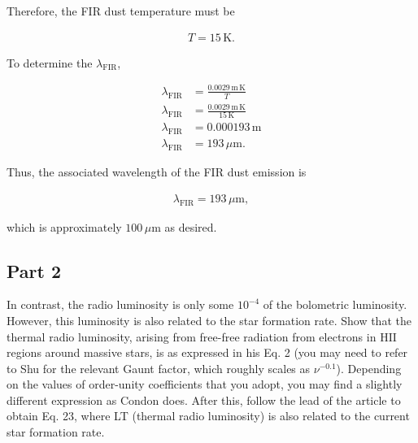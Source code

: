 \documentclass[12pt]{article}
\begin{document}
{\noindent}Therefore, the FIR dust temperature must be

\begin{align*}
    \boxed{T = 15 \,\mathrm{K}}.
\end{align*}

{\noindent}To determine the $\lambda_\mathrm{FIR}$,

\begin{align*}
    \lambda_\mathrm{FIR} &= \frac{0.0029\,\mathrm{m\,K}}{T} \\
    \lambda_\mathrm{FIR} &= \frac{0.0029\,\mathrm{m\,K}}{15 \,\mathrm{K}} \\
    \lambda_\mathrm{FIR} &= 0.000193\,\mathrm{m} \\
    \lambda_\mathrm{FIR} &= 193\,\mu\mathrm{m}.
\end{align*}

{\noindent}Thus, the associated wavelength of the FIR dust emission is

\begin{align*}
    \boxed{\lambda_\mathrm{FIR} = 193\,\mu\mathrm{m}},
\end{align*}

{\noindent}which is approximately $100\,\mu\mathrm{m}$ as desired.


\subsection*{Part 2}

In contrast, the radio luminosity is only some $10^{−4}$ of the bolometric luminosity. However, this luminosity is also related to the star formation rate. Show that the thermal radio luminosity, arising from free-free radiation from electrons in $\mathrm{HII}$ regions around massive stars, is as expressed in his Eq. 2 (you may need to refer to Shu for the relevant Gaunt factor, which roughly scales as $\nu^{-0.1}$). Depending on the values of order-unity coefficients that you adopt, you may find a slightly different expression as Condon does. After this, follow the lead of the article to obtain Eq. 23, where LT (thermal radio luminosity) is also related to the current star formation rate.

\end{document}
